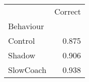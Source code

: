 \begin{tabular}{lr}
\toprule
{} &  Correct \\
Behaviour &          \\
\midrule
Control   &    0.875 \\
Shadow    &    0.906 \\
SlowCoach &    0.938 \\
\bottomrule
\end{tabular}

